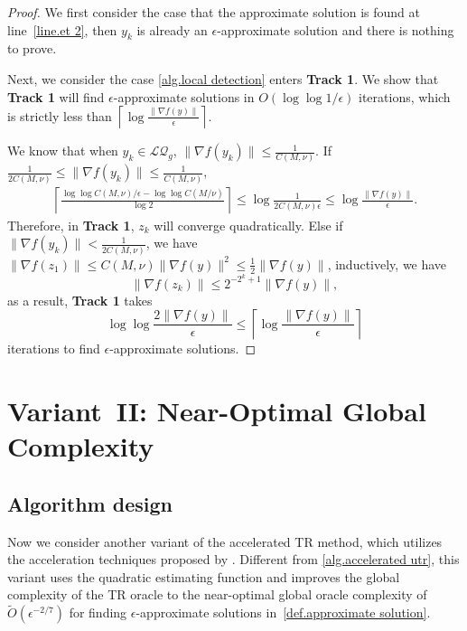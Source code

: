 \documentclass{article}
\begin{document}
\begin{proof}
    We first consider the case that the approximate solution is found at line~\ref{line.et 2}, then $y_k$ is already an $\epsilon$-approximate solution and there is nothing to prove. 

    Next, we consider the case \autoref{alg.local detection} enters \textbf{Track 1}. We show that \textbf{Track 1} will find $\epsilon$-approximate solutions in $O(\log\log 1/\epsilon)$ iterations, which is strictly less than $\left \lceil\log\frac{\|\nabla f(y)\|}{\epsilon} \right\rceil$. 

    We know that when $y_k\in\mathcal{LQ}_g$, $\|\nabla f(y_k)\|\leq \frac{1}{C(M,\nu)}$. If $\frac{1}{2C(M,\nu)}\leq \|\nabla f(y_k)\|\leq \frac{1}{C(M,\nu)}$,
    \begin{equation*}
        \begin{aligned}
            \left\lceil\frac{\log\log C(M,\nu)/\epsilon-\log\log C(M/\nu)}{\log2}\right\rceil\leq\log\frac{1}{2C(M,\nu)\epsilon}\leq\log\frac{\|\nabla f(y)\|}{\epsilon}.
        \end{aligned}
    \end{equation*}
    Therefore, in \textbf{Track 1}, $z_k$ will converge quadratically. Else if $\|\nabla f(y_k)\|< \frac{1}{2C(M,\nu)}$, we have $\|\nabla f(z_1)\|\leq C(M,\nu)\|\nabla f(y)\|^2\leq \frac{1}{2}\|\nabla f(y)\|$, inductively, we have
    \begin{equation*}
        \|\nabla f(z_k)\| \leq 2^{-2^k+1}\|\nabla f(y)\|,
    \end{equation*}
    as a result, \textbf{Track 1} takes 
    \begin{equation*}
        \log\log\frac{2\|\nabla f(y)\|}{\epsilon}\leq \left \lceil \log\frac{\|\nabla f(y)\|}{\epsilon}\right \rceil
    \end{equation*}
    iterations to find $\epsilon$-approximate solutions.
\end{proof}
\section{Variant~II: Near-Optimal Global Complexity}\label{sec.second variant}
\subsection{Algorithm design}
Now we consider another variant of the accelerated TR method, which utilizes the acceleration techniques proposed by \citet{monteiro2013accelerated}. Different from \autoref{alg.accelerated utr}, this variant uses the quadratic estimating function and improves the global complexity of the TR oracle to the near-optimal global oracle complexity of $\tilde O(\epsilon^{-2/7})$ for finding $\epsilon$-approximate solutions in~\autoref{def.approximate solution}.
\end{document}
